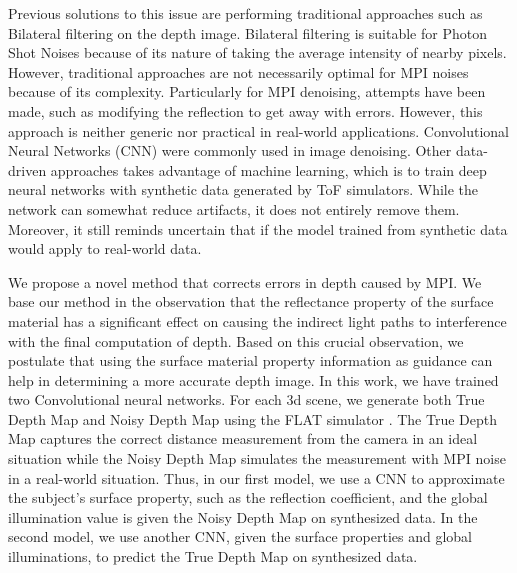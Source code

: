 \documentclass[a4paper, 11pt]{article}
\begin{document}


% 
Previous solutions \cite{tomasi1998bilateral, zhang2014rolling} to this issue are performing traditional approaches such as Bilateral filtering on the depth image. 
Bilateral filtering is suitable for Photon Shot Noises because of its nature of taking the average intensity of nearby pixels. 
However, traditional approaches are not necessarily optimal for MPI noises because of its complexity. 
Particularly for MPI denoising, attempts have been made, such as modifying the reflection to get away with errors. 
However, this approach is neither generic nor practical in real-world applications. 
Convolutional Neural Networks (CNN) were commonly used in image denoising. 
Other data-driven approaches \cite{bolsee2018cnn,marco2017deeptof} takes advantage of machine learning, which is to train deep neural networks with synthetic data generated by ToF simulators. 
While the network can somewhat reduce artifacts, it does not entirely remove them. 
Moreover, it still reminds uncertain that if the model trained from synthetic data would apply to real-world data. 

% 
We propose a novel method that corrects errors in depth caused by MPI. 
We base our method in the observation that the reflectance property of the surface material has a significant effect on causing the indirect light paths to interference with the final computation of depth. 
Based on this crucial observation, we postulate that using the surface material property information as guidance can help in determining a more accurate depth image. 
In this work, we have trained two Convolutional neural networks.
For each 3d scene, we generate both True Depth Map and Noisy Depth Map using the FLAT simulator \cite{guo2018flat}. 
The True Depth Map captures the correct distance measurement from the camera in an ideal situation while the Noisy Depth Map simulates the measurement with MPI noise in a real-world situation. 
Thus, in our first model, we use a CNN to approximate the subject's surface property, such as the reflection coefficient, and the global illumination value is given the Noisy Depth Map on synthesized data. 
In the second model, we use another CNN, given the surface properties and global illuminations, to predict the True Depth Map on synthesized data. 
\end{document}
